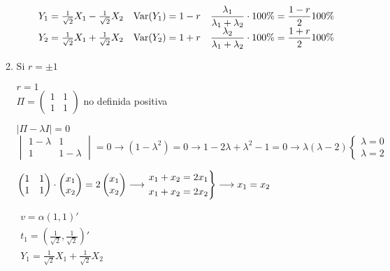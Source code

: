 \begin{enumerate}[label=\color{red}\textbf{\arabic*)}, leftmargin=*]
\begin{enumerate}[label=\color{lightblue}\textbf{\alph*)}]
\begin{enumerate}[label=\color{lightblue}\arabic*)]
	$\begin{array}{lll}
		Y_1=\frac{1}{\sqrt{2}}X_1-\frac{1}{\sqrt{2}}X_2 & \operatorname{Var}(Y_1)=1-r & \dfrac{\lambda_1}{\lambda_1+\lambda_2}\cdot100\%=\dfrac{1-r}{2}100\%\\
		Y_2=\frac{1}{\sqrt{2}}X_1+\frac{1}{\sqrt{2}}X_2 & \operatorname{Var}(Y_2)=1+r & \dfrac{\lambda_2}{\lambda_1+\lambda_2}\cdot100\%=\dfrac{1+r}{2}100\%\\
	\end{array}$
	\end{enumerate}
	\item Si $r=\pm1$
	
	$r=1$\\
	$\Pi=\begin{pmatrix}
		1  & 1\\
		1 & 1
	\end{pmatrix}$ no definida positiva 
	
	$|\Pi-\lambda I|=0$\\
	$\begin{vmatrix}
		1-\lambda & 1\\
		1 & 1-\lambda
	\end{vmatrix}=0\longrightarrow(1-\lambda^2)=0\longrightarrow 1-2\lambda+\lambda^2-1=0\longrightarrow\lambda(\lambda-2)\begin{cases}
	\lambda=0\\
	\lambda=2
	\end{cases}$
	
	$\begin{pmatrix}
	1 & 1\\
	1 & 1
	\end{pmatrix}\cdot\begin{pmatrix}
	x_1\\
	x_2
	\end{pmatrix}=2\begin{pmatrix}
	x_1\\
	x_2
	\end{pmatrix}\longrightarrow\begin{rcases}
	x_1+x_2=2x_1\\
	x_1+x_2=2x_2
	\end{rcases}\longrightarrow x_1=x_2$
	
	$\begin{array}{l}
		v=\alpha(1,1)'\\
		t_1=\left(\frac{1}{\sqrt{2}},\frac{1}{\sqrt{2}}\right)'\\
		Y_1=\frac{1}{\sqrt{2}}X_1+\frac{1}{\sqrt{2}}X_2
	\end{array}$
	

\end{enumerate}
\end{enumerate}
